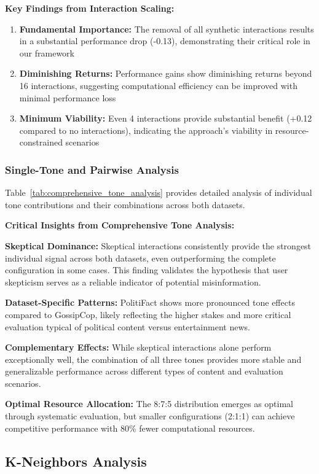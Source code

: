 \textbf{Key Findings from Interaction Scaling:}
\begin{enumerate}
\item \textbf{Fundamental Importance:} The removal of all synthetic interactions results in a substantial performance drop (-0.13), demonstrating their critical role in our framework
\item \textbf{Diminishing Returns:} Performance gains show diminishing returns beyond 16 interactions, suggesting computational efficiency can be improved with minimal performance loss
\item \textbf{Minimum Viability:} Even 4 interactions provide substantial benefit (+0.12 compared to no interactions), indicating the approach's viability in resource-constrained scenarios
\end{enumerate}

\subsubsection{Single-Tone and Pairwise Analysis}

Table~\ref{tab:comprehensive_tone_analysis} provides detailed analysis of individual tone contributions and their combinations across both datasets.

\textbf{Critical Insights from Comprehensive Tone Analysis:}

\textbf{Skeptical Dominance:} Skeptical interactions consistently provide the strongest individual signal across both datasets, even outperforming the complete configuration in some cases. This finding validates the hypothesis that user skepticism serves as a reliable indicator of potential misinformation.

\textbf{Dataset-Specific Patterns:} PolitiFact shows more pronounced tone effects compared to GossipCop, likely reflecting the higher stakes and more critical evaluation typical of political content versus entertainment news.

\textbf{Complementary Effects:} While skeptical interactions alone perform exceptionally well, the combination of all three tones provides more stable and generalizable performance across different types of content and evaluation scenarios.

\textbf{Optimal Resource Allocation:} The 8:7:5 distribution emerges as optimal through systematic evaluation, but smaller configurations (2:1:1) can achieve competitive performance with 80\% fewer computational resources.

\subsection{K-Neighbors Analysis}

